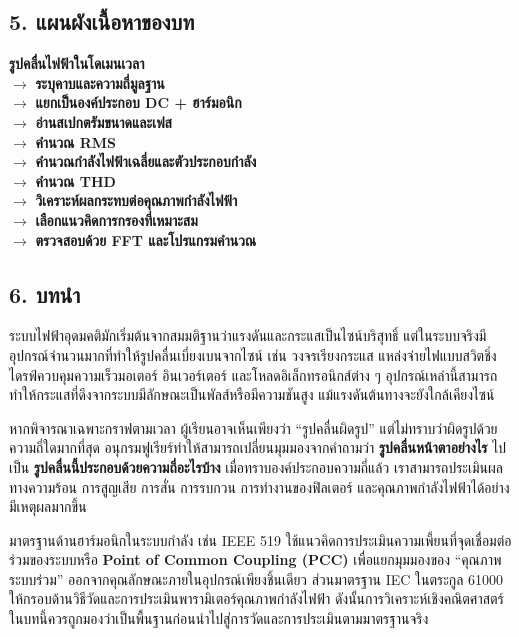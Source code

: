 \subsection{5. แผนผังเนื้อหาของบท}

\textbf{รูปคลื่นไฟฟ้าในโดเมนเวลา} \\
$\rightarrow$ \textbf{ระบุคาบและความถี่มูลฐาน} \\
$\rightarrow$ \textbf{แยกเป็นองค์ประกอบ DC + ฮาร์มอนิก} \\
$\rightarrow$ \textbf{อ่านสเปกตรัมขนาดและเฟส} \\
$\rightarrow$ \textbf{คำนวณ RMS} \\
$\rightarrow$ \textbf{คำนวณกำลังไฟฟ้าเฉลี่ยและตัวประกอบกำลัง} \\
$\rightarrow$ \textbf{คำนวณ THD} \\
$\rightarrow$ \textbf{วิเคราะห์ผลกระทบต่อคุณภาพกำลังไฟฟ้า} \\
$\rightarrow$ \textbf{เลือกแนวคิดการกรองที่เหมาะสม} \\
$\rightarrow$ \textbf{ตรวจสอบด้วย FFT และโปรแกรมคำนวณ}



\subsection{6. บทนำ}

ระบบไฟฟ้าอุดมคติมักเริ่มต้นจากสมมติฐานว่าแรงดันและกระแสเป็นไซน์บริสุทธิ์ แต่ในระบบจริงมีอุปกรณ์จำนวนมากที่ทำให้รูปคลื่นเบี่ยงเบนจากไซน์ เช่น วงจรเรียงกระแส แหล่งจ่ายไฟแบบสวิตชิ่ง ไดรฟ์ควบคุมความเร็วมอเตอร์ อินเวอร์เตอร์ และโหลดอิเล็กทรอนิกส์ต่าง ๆ อุปกรณ์เหล่านี้สามารถทำให้กระแสที่ดึงจากระบบมีลักษณะเป็นพัลส์หรือมีความชันสูง แม้แรงดันต้นทางจะยังใกล้เคียงไซน์

หากพิจารณาเฉพาะกราฟตามเวลา ผู้เรียนอาจเห็นเพียงว่า “รูปคลื่นผิดรูป” แต่ไม่ทราบว่าผิดรูปด้วยความถี่ใดมากที่สุด อนุกรมฟูเรียร์ทำให้สามารถเปลี่ยนมุมมองจากคำถามว่า \textbf{รูปคลื่นหน้าตาอย่างไร} ไปเป็น \textbf{รูปคลื่นนี้ประกอบด้วยความถี่อะไรบ้าง} เมื่อทราบองค์ประกอบความถี่แล้ว เราสามารถประเมินผลทางความร้อน การสูญเสีย การสั่น การรบกวน การทำงานของฟิลเตอร์ และคุณภาพกำลังไฟฟ้าได้อย่างมีเหตุผลมากขึ้น

มาตรฐานด้านฮาร์มอนิกในระบบกำลัง เช่น IEEE 519 ใช้แนวคิดการประเมินความเพี้ยนที่จุดเชื่อมต่อร่วมของระบบหรือ \textbf{Point of Common Coupling (PCC)} เพื่อแยกมุมมองของ “คุณภาพระบบร่วม” ออกจากคุณลักษณะภายในอุปกรณ์เพียงชิ้นเดียว ส่วนมาตรฐาน IEC ในตระกูล 61000 ให้กรอบด้านวิธีวัดและการประเมินพารามิเตอร์คุณภาพกำลังไฟฟ้า ดังนั้นการวิเคราะห์เชิงคณิตศาสตร์ในบทนี้ควรถูกมองว่าเป็นพื้นฐานก่อนนำไปสู่การวัดและการประเมินตามมาตรฐานจริง



